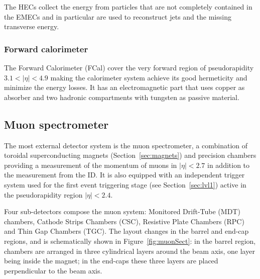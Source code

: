 The HECs collect the energy from particles that are not completely contained
in the EMECs and in particular are used to reconstruct jets and the missing transverse
energy.

\subsubsection{Forward calorimeter}\label{sec:calforward}

The Forward Calorimeter (FCal) cover the very forward region of pseudorapidity
$3.1<|\eta|<4.9$ making the calorimeter system achieve its good hermeticity
and minimize the energy losses.
It has an electromagnetic part that uses copper as absorber and two hadronic compartments
with tungsten as passive material. 




\subsection{Muon spectrometer}\label{sec:muonspec}

The most external detector system is the muon spectrometer, a combination
of toroidal superconducting magnets (Section~\ref{sec:magnets}) and precision
chambers providing a measurement of the momentum of muons in $|\eta|<2.7$ in addition
to the measurement from the ID. It is also equipped 
with an independent trigger system used for the first event triggering
stage (see Section~\ref{sec:lvl1}) active in the pseudorapidity region $|\eta|<2.4$. 

Four sub-detectors compose the muon system: Monitored Drift-Tube (MDT) chambers, 
Cathode Strips Chambers (CSC), Resistive Plate Chambers (RPC) and Thin Gap Chambers (TGC).
The layout changes in the barrel and end-cap regions, and is schematically shown in 
Figure~\ref{fig:muonSect}: in the  barrel region, chambers are arranged in three cylindrical layers around
the beam axis, one layer being inside the magnet; in the end-caps these three layers are placed 
perpendicular to the beam axis.

